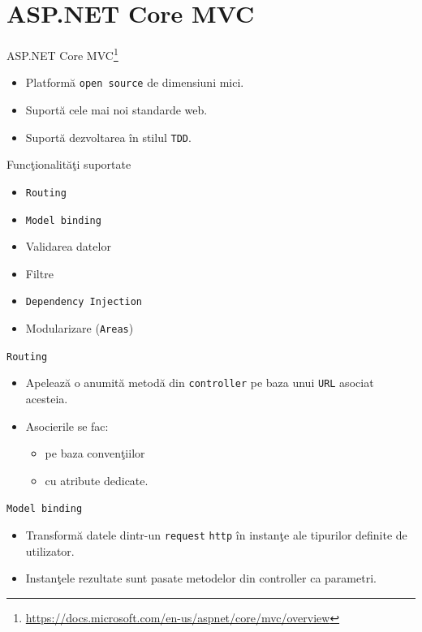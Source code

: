 \documentclass[presentation]{beamer}
\begin{document}
\section{ASP.NET Core MVC}
\label{sec:orgc9c5e8e}
\begin{frame}[label={sec:orge91f194},fragile]{ASP.NET Core MVC\footnote{\url{https://docs.microsoft.com/en-us/aspnet/core/mvc/overview}}}
 \begin{itemize}
\item Platformă \texttt{open source} de dimensiuni mici.
\item Suportă cele mai noi standarde web.
\item Suportă dezvoltarea în stilul \texttt{TDD}.
\end{itemize}
\end{frame}
\begin{frame}[label={sec:org97ed33d},fragile]{Funcţionalităţi suportate}
 \begin{itemize}
\item \texttt{Routing}
\item \texttt{Model binding}
\item Validarea datelor
\item Filtre
\item \texttt{Dependency Injection}
\item Modularizare (\texttt{Areas})
\end{itemize}
\end{frame}
\begin{frame}[label={sec:org7631754},fragile]{\texttt{Routing}}
 \begin{itemize}
\item Apelează o anumită metodă din \texttt{controller} pe baza unui \texttt{URL} asociat acesteia.
\item Asocierile se fac:
\begin{itemize}
\item pe baza convenţiilor
\item cu atribute dedicate.
\end{itemize}
\end{itemize}
\end{frame}
\begin{frame}[label={sec:org843d9ed},fragile]{\texttt{Model binding}}
 \begin{itemize}
\item Transformă datele dintr-un \texttt{request} \texttt{http} în instanţe ale tipurilor definite de utilizator.
\item Instanţele rezultate sunt pasate metodelor din controller ca parametri.
\end{itemize}
\end{frame}
\end{document}
